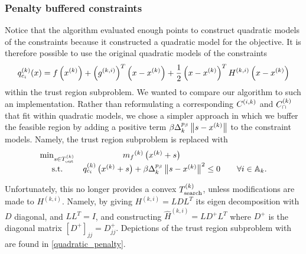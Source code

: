 
\subsubsection{Penalty buffered constraints}
\label{penalty_buffered_description}

Notice that the algorithm evaluated enough points to construct quadratic models of the constraints because it constructed a quadratic model for the objective.
It is therefore possible to use the original quadratic models of the constraints
\begin{align*}
q_{c_i}^{(k)}(x) = f\left(x^{(k)}\right) + \left(g^{(k, i)}\right)^T\left(x - x^{(k)}\right) + \frac 1 2 \left(x - x^{(k)}\right)^T H^{(k, i)}\left(x - x^{(k)}\right)
\end{align*}
within the trust region subproblem.
We wanted to compare our algorithm to such an implementation.
Rather than reformulating a corresponding ${C^{(i, k)}}$ and ${C^{(k)}_{\cap}}$ that fit within quadratic models,
we chose a simpler approach in which we buffer the feasible region by adding a positive term $\beta \Delta_k^{p_\beta}\left\|s - x^{(k)}\right\|$ to the constraint models.
Namely, the trust region subproblem is replaced with
\begin{align*}
\begin{array}{ccc}
\min_{s \in {T_{\text{out}}^{(k)}}} & {{m}_f}^{(k)}\left(x^{(k)} + s\right) & \\
\textrm{s.t.} & q_{c_i}^{(k)}\left(x^{(k)} + s\right) + \beta \Delta_k^{p_{\beta}}\left\|s - x^{(k)}\right\|^2 \le 0 &\quad \forall i \in {\mathbb A_{k}}.
\end{array}
\end{align*}

Unfortunately, this no longer provides a convex ${T_{\text{search}}^{(k)}}$, unless modifications are made to $H^{(k, i)}$.
Namely, by giving $H^{(k, i)} = L D L^T$ its eigen decomposition with $D$ diagonal, and $LL^T = I$, and 
constructing $\hat H^{(k, i)} = L D^+ L^T$ where $D^+$ is the diagonal matrix $[D^+]_{jj} = D_{jj}^+$.
Depictions of the trust region subproblem with are found in \cref{quadratic_penalty}.

